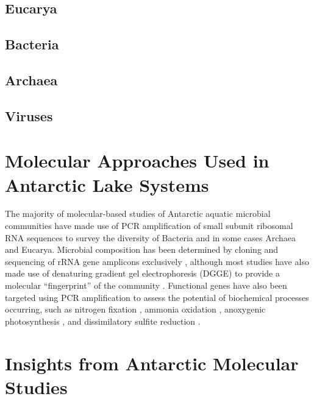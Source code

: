 \subsection{Eucarya}
\subsection{Bacteria}
\subsection{Archaea}
\subsection{Viruses}


\section{Molecular Approaches Used in Antarctic Lake Systems}
\label{in:mol}
The majority of molecular-based studies of Antarctic aquatic microbial communities have made use of PCR amplification of small subunit ribosomal RNA sequences to survey the diversity of Bacteria
 and in some cases Archaea and Eucarya. %
Microbial composition has been determined by cloning and sequencing of rRNA gene amplicons exclusively 
\cite{Bowman2000a, Bowman2000, Gordon2000, Christner2001, Purdy2003, Karr2006, Matsuzaki2006, Kurosawa2010,Bielewicz2011}, 
although most studies have also made use of denaturing gradient gel electrophoresis (DGGE) to provide a molecular ``fingerprint'' of the community 
\cite{Pearce2003, Pearce2003, Karr2005, Pearce2005, Pearce2005, Unrein2005, Glatz2006, Mikucki2007, Mosier2007, Schiaffino2009, Villaescusa2010}.
Functional genes have also been targeted using PCR amplification to assess the potential of biochemical processes occurring, such as nitrogen fixation \cite{Olsen1998}, 
ammonia oxidation \cite{Voytek1999}, anoxygenic photosynthesis \cite{Karr2003}, and dissimilatory sulfite reduction \cite{Karr2005, Mikucki2009}. %


\section{Insights from Antarctic Molecular Studies}
\label{in:insights}
